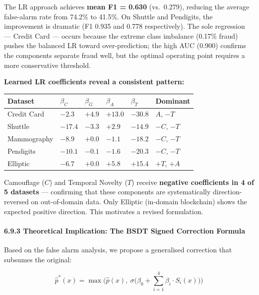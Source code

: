 \documentclass[
  11pt,
]{article}
\newcounter{none} %
\begin{document}
The LR approach achieves \textbf{mean F1 = 0.630} (vs.~0.279), reducing
the average false-alarm rate from 74.2\% to 41.5\%. On Shuttle and
Pendigits, the improvement is dramatic (F1 0.935 and 0.778
respectively). The sole regression — Credit Card — occurs because the
extreme class imbalance (0.17\% fraud) pushes the balanced LR toward
over-prediction; the high AUC (0.900) confirms the components separate
fraud well, but the optimal operating point requires a more conservative
threshold.

\textbf{Learned LR coefficients reveal a consistent pattern:}

{\def\LTcaptype{none} %
\begin{longtable}[]{@{}llllll@{}}
\toprule\noalign{}
Dataset & \(\beta_C\) & \(\beta_G\) & \(\beta_A\) & \(\beta_T\) &
Dominant \\
\midrule\noalign{}
\endhead
\bottomrule\noalign{}
\endlastfoot
Credit Card & \(-2.3\) & \(+4.9\) & \(+13.0\) & \(-30.8\) & \(A\),
\(-T\) \\
Shuttle & \(-17.4\) & \(-3.3\) & \(+2.9\) & \(-14.9\) & \(-C\),
\(-T\) \\
Mammography & \(-8.9\) & \(+0.0\) & \(-1.1\) & \(-18.2\) & \(-C\),
\(-T\) \\
Pendigits & \(-10.1\) & \(-0.1\) & \(-1.6\) & \(-20.3\) & \(-C\),
\(-T\) \\
Elliptic & \(-6.7\) & \(+0.0\) & \(+5.8\) & \(+15.4\) & \(+T\),
\(+A\) \\
\end{longtable}
}

Camouflage (\(C\)) and Temporal Novelty (\(T\)) receive \textbf{negative
coefficients in 4 of 5 datasets} — confirming that these components are
systematically direction-reversed on out-of-domain data. Only Elliptic
(in-domain blockchain) shows the expected positive direction. This
motivates a revised formulation.

\paragraph{6.9.3 Theoretical Implication: The BSDT Signed Correction
Formula}\label{theoretical-implication-the-bsdt-signed-correction-formula}

Based on the false alarm analysis, we propose a generalised correction
that subsumes the original:

\[\hat{p}^*(x) = \max\!\Big(\hat{p}(x),\ \sigma\!\Big(\beta_0 + \sum_{i=1}^{4} \beta_i \cdot S_i(x)\Big)\!\Big)\]
\end{document}
